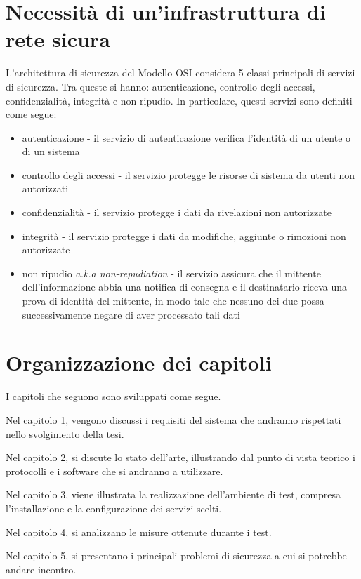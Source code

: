 \section{Necessità di un'infrastruttura di rete sicura}
L'architettura di sicurezza del Modello OSI considera 5 classi principali di servizi di sicurezza. Tra queste si hanno: autenticazione, controllo degli accessi, confidenzialità, integrità e non ripudio.
In particolare, questi servizi sono definiti come segue:
\begin{itemize}
    \item autenticazione - il servizio di autenticazione verifica l'identità di un utente o di un sistema
    \item controllo degli accessi - il servizio protegge le risorse di sistema da utenti non autorizzati
    \item confidenzialità - il servizio protegge i dati da rivelazioni non autorizzate
    \item integrità - il servizio protegge i dati da modifiche, aggiunte o rimozioni non autorizzate
    \item non ripudio \emph{a.k.a non-repudiation} - il servizio assicura che il mittente dell'informazione abbia una notifica di consegna e il destinatario riceva una prova di identità del mittente, in modo tale che nessuno dei due possa successivamente negare di aver processato tali dati
\end{itemize}


\section{Organizzazione dei capitoli}
I capitoli che seguono sono sviluppati come segue.

Nel capitolo 1, vengono discussi i requisiti del sistema che andranno rispettati nello svolgimento della tesi.

Nel capitolo 2, si discute lo stato dell'arte, illustrando dal punto di vista teorico i protocolli e i software che si andranno a utilizzare.

Nel capitolo 3, viene illustrata la realizzazione dell'ambiente di test, compresa l'installazione e la configurazione dei servizi scelti.

Nel capitolo 4, si analizzano le misure ottenute durante i test.

Nel capitolo 5, si presentano i principali problemi di sicurezza a cui si potrebbe andare incontro.

